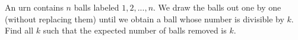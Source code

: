 An urn contains $n$ balls labeled $1, 2, ... , n$. We draw the balls out one by one (without replacing them) until we obtain a ball whose number is divisible by $k$. Find all $k$ such that the expected number of balls removed is $k$.